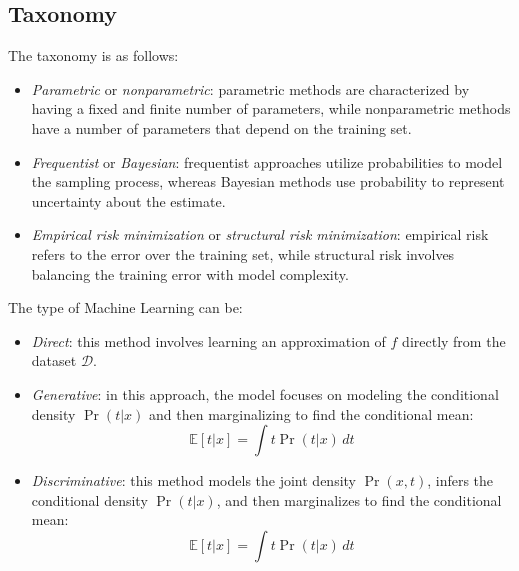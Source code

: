 \subsection{Taxonomy}
The taxonomy is as follows: 
\begin{itemize}
    \item \textit{Parametric} or \textit{nonparametric}: parametric methods are characterized by having a fixed and finite number of parameters, while nonparametric methods have a number of parameters that depend on the training set.
    \item \textit{Frequentist} or \textit{Bayesian}: frequentist approaches utilize probabilities to model the sampling process, whereas Bayesian methods use probability to represent uncertainty about the estimate.
    \item \textit{Empirical risk minimization} or \textit{structural risk minimization}: empirical risk refers to the error over the training set, while structural risk involves balancing the training error with model complexity.
\end{itemize}
The type of Machine Learning can be: 
\begin{itemize}
    \item \textit{Direct}: this method involves learning an approximation of $f$ directly from the dataset $\mathcal{D}$.
    \item \textit{Generative}: in this approach, the model focuses on modeling the conditional density $\Pr(t | x)$ and then marginalizing to find the conditional mean:
        \[\mathbb{E} \left[ t | x \right] = \int t \Pr(t | x)\, dt\]
    \item \textit{Discriminative}: this method models the joint density $\Pr(x,t)$, infers the conditional density $\Pr(t | x)$, and then marginalizes to find the conditional mean:
        \[\mathbb{E} \left[ t | x \right] = \int t \Pr(t | x)\, dt\]
\end{itemize}